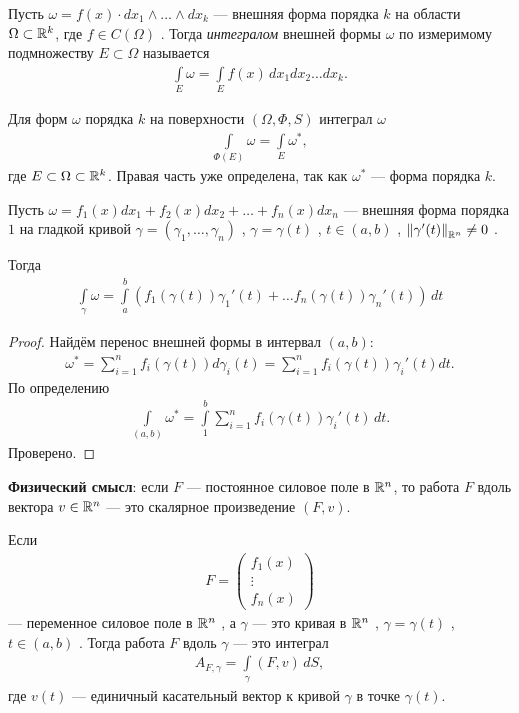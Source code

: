 \begin{df}
 Пусть $\omega = f(x) \cdot dx_1 \land \ldots \land dx_k$  --- внешняя форма порядка $k$ на области $\Omega \subset \mathbb{R}^{k}$, где $f \in C(\Omega)$ . Тогда \textit{интегралом} внешней формы $\omega$ по измеримому подмножеству $E \subset \Omega$ называется
 \begin{align*}
  \int\limits_{E} \omega = \int\limits_{E} f(x) \, dx_1 dx_2 \ldots dx_k
 .\end{align*} 

 Для форм $\omega$  порядка $k$  на поверхности $(\Omega, \Phi, S)$  интеграл $\omega$
  \begin{align*}
  \int\limits_{\Phi(E)} \omega = \int\limits_{E} \omega^{\ast}
 ,\end{align*} где $E \subset \Omega \subset \mathbb{R}^{k}$. Правая часть уже определена, так как $\omega^{\ast}$ --- форма порядка $k$.
\end{df}

\begin{claim}
 Пусть $\omega = f_1(x) dx_1 + f_2(x) dx_2 + \ldots + f_{n}(x) dx_n$  --- внешняя форма порядка $1$  на гладкой кривой $\gamma = (\gamma_1, \ldots, \gamma_n )$ , $\gamma = \gamma(t)$ , $t \in (a,b)$ , $\left\| \gamma'(t) \right\|_{\mathbb{R}^{n}} \neq 0$ .

 Тогда
 \begin{align*}
  \int\limits_{\gamma} \omega = \int\limits_{a}^{b} \left( f_1(\gamma(t)) \gamma_1'(t) + \ldots f_n(\gamma(t)) \gamma_n'(t) \right) \, dt
 \end{align*} 
\end{claim}
\begin{proof}
 Найдём перенос внешней формы в интервал $(a, b)$:
  \begin{align*}
  \omega^{\ast} = \sum_{i=1}^{n} f_i(\gamma(t)) d \gamma_i(t) = \sum_{i=1}^{n} f_i(\gamma(t)) \gamma_i'(t) dt
 .\end{align*} По определению
 \begin{align*}
  \int\limits_{(a,b)} \omega^{\ast} = \int\limits_{1}^{b} \sum_{i=1}^{n} f_i(\gamma(t))\gamma_i'(t)  \, dt
 .\end{align*} Проверено.
\end{proof}

\textbf{Физический смысл}: если $F$ --- постоянное силовое поле в $\mathbb{R}^{n}$, то работа $F$ вдоль вектора $v \in \mathbb{R}^{n}$ --- это скалярное произведение $(F, v)$.

Если
\begin{align*}
 F = \begin{pmatrix}
  f_1(x) \\
  \vdots \\
  f_n(x)
 \end{pmatrix}
\end{align*}  --- переменное силовое поле в $\mathbb{R}^{n}$ , а $\gamma$  --- это кривая в $\mathbb{R}^{n}$ , $\gamma = \gamma(t)$ , $t \in (a, b)$ . Тогда работа $F$  вдоль $\gamma$ --- это интеграл
\begin{align*}
 A_{F,\gamma} = \int\limits_{\gamma} (F,v) \, dS
,\end{align*} где $v(t)$ --- единичный касательный вектор к кривой $\gamma$  в точке $\gamma(t)$.

